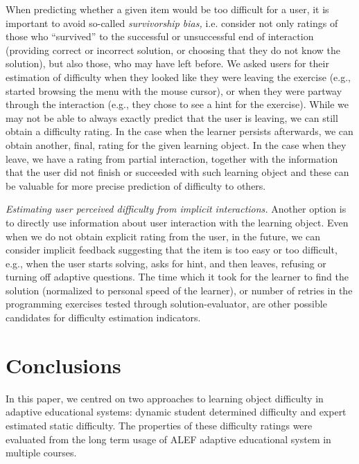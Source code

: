\documentclass{llncs}
\begin{document}
When predicting whether a given item would be too difficult for a user, it is important to avoid so-called \emph{survivorship bias,} i.e. consider not only ratings of those who ``survived'' to the successful or unsuccessful end of interaction (providing correct or incorrect solution, or choosing that they do not know the solution), but also those, who may have left before. We asked users for their estimation of difficulty when they looked like they were leaving the exercise (e.g., started browsing the menu with the mouse cursor), or when they were partway through the interaction (e.g., they chose to see a hint for the exercise). While we may not be able to always exactly predict that the user is leaving, we can still obtain a difficulty rating. In the case when the learner persists afterwards, we can obtain another, final, rating for the given learning object. In the case when they leave, we have a rating from partial interaction, together with the information that the user did not finish or succeeded with such learning object and these can be valuable for more precise prediction of difficulty to others.

\emph{Estimating user perceived difficulty from implicit interactions.} Another option is to directly use information about user interaction with the learning object. Even when we do not obtain explicit rating from the user, in the future, we can consider implicit feedback suggesting that the item is too easy or too difficult, e.g., when the user starts solving, asks for hint, and then leaves, refusing or turning off adaptive questions. The time which it took for the learner to find the solution (normalized to personal speed of the learner), or number of retries in the programming exercises tested through solution-evaluator, are other possible candidates for difficulty estimation indicators.

\section{Conclusions}
\label{sec6}
In this paper, we centred on two approaches to learning object difficulty in adaptive educational systems: dynamic student determined difficulty and expert estimated static difficulty. The properties of these difficulty ratings were evaluated from the long term usage of ALEF adaptive educational system in multiple courses.
\end{document}

